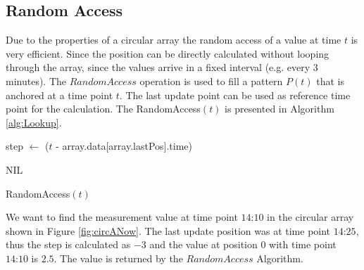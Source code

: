 \documentclass[abstracton,12pt,oneside]{scrreprt}
\begin{document}
\subsection{Random Access}
Due to the properties of a circular array the random access of a value at time $t$ is very efficient. Since the position can be directly calculated without looping through the array, since the values arrive in a fixed interval (e.g. every 3 minutes). The $RandomAccess$ operation is used to fill a pattern $P(t)$ that is anchored at a time point $t$. The last update point can be used as reference time point for the calculation. The RandomAccess$(t)$ is presented in Algorithm \ref{alg:Lookup}.
\BlankLine
\begin{algorithm}[H]
	\IncMargin{1em}
	\SetAlgoLined
	\DontPrintSemicolon
	
	
	
	
	step $\leftarrow$ ($t$ - array.data[array.lastPos].time)\;
	
	
	\Return NIL\;
	
	
	
	
	\caption{RandomAccess$(t)$}	
	\label{alg:Lookup}
\end{algorithm}


\begin{exmp}
	We want to find the measurement value at time point $\text{14:10}$ in the circular array shown in Figure \ref{fig:circANow}. The last update position was at time point $\text{14:25}$, thus the step is calculated as $-3$ and the value at position $0$ with time point $\text{14:10}$ is $2.5$. The value is returned by the $RandomAccess$ Algorithm. 
\end{exmp}
\end{document}
